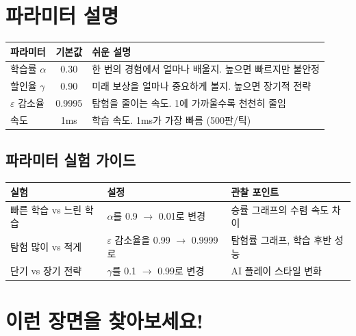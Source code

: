 \documentclass[11pt,a4paper]{article}
\begin{document}
\section{ 파라미터 설명}

\begin{center}
\renewcommand{\arraystretch}{1.4}
\begin{tabular}{|l|c|p{6.5cm}|}
\hline
\rowcolor{tableheader}
\textbf{파라미터} & \textbf{기본값} & \textbf{쉬운 설명} \\
\hline
학습률 $\alpha$ & 0.30 & 한 번의 경험에서 얼마나 배울지. 높으면 빠르지만 불안정 \\
\hline
할인율 $\gamma$ & 0.90 & 미래 보상을 얼마나 중요하게 볼지. 높으면 장기적 전략 \\
\hline
$\varepsilon$ 감소율 & 0.9995 & 탐험을 줄이는 속도. 1에 가까울수록 천천히 줄임 \\
\hline
속도 & 1ms & 학습 속도. 1ms가 가장 빠름 (500판/틱) \\
\hline
\end{tabular}
\end{center}

\subsection{파라미터 실험 가이드}

\begin{center}
\renewcommand{\arraystretch}{1.4}
\begin{tabular}{|p{3.5cm}|p{4cm}|p{4.5cm}|}
\hline
\rowcolor{tableheader}
\textbf{실험} & \textbf{설정} & \textbf{관찰 포인트} \\
\hline
빠른 학습 vs 느린 학습 & $\alpha$를 0.9 $\to$ 0.01로 변경 & 승률 그래프의 수렴 속도 차이 \\
\hline
탐험 많이 vs 적게 & $\varepsilon$ 감소율을 0.99 $\to$ 0.9999로 & 탐험률 그래프, 학습 후반 성능 \\
\hline
단기 vs 장기 전략 & $\gamma$를 0.1 $\to$ 0.99로 변경 & AI 플레이 스타일 변화 \\
\hline
\end{tabular}
\end{center}

\section{ 이런 장면을 찾아보세요!}
\end{document}
